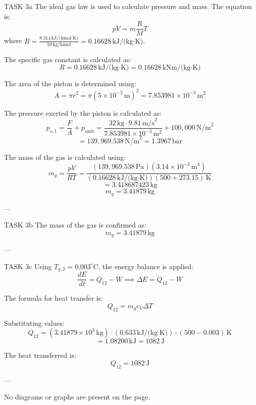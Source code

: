 TASK 3a  
The ideal gas law is used to calculate pressure and mass. The equation is:  
\[
pV = m \frac{R}{M} T
\]  
where \( R = \frac{8.314 \, \text{kJ/(kmol·K)}}{50 \, \text{kg/kmol}} = 0.16628 \, \text{kJ/(kg·K)} \).  

The specific gas constant is calculated as:  
\[
R = 0.16628 \, \text{kJ/(kg·K)} = 0.16628 \, \text{kNm/(kg·K)}
\]  

The area of the piston is determined using:  
\[
A = \pi r^2 = \pi (5 \times 10^{-2} \, \text{m})^2 = 7.853981 \times 10^{-3} \, \text{m}^2
\]  

The pressure exerted by the piston is calculated as:  
\[
p_{s,1} = \frac{F}{A} + p_{\text{amb}} = \frac{32 \, \text{kg} \cdot 9.81 \, \text{m/s}^2}{7.853981 \times 10^{-3} \, \text{m}^2} + 100,000 \, \text{N/m}^2
\]  
\[
= 139,969.538 \, \text{N/m}^2 = 1.3967 \, \text{bar}
\]  

The mass of the gas is calculated using:  
\[
m_g = \frac{pV}{RT} = \frac{(139,969.538 \, \text{Pa})(3.14 \times 10^{-3} \, \text{m}^3)}{(0.16628 \, \text{kJ/(kg·K)})(500 + 273.15) \, \text{K}}
\]  
\[
= 3.418687423 \, \text{kg}
\]  
\[
m_g = 3.41879 \, \text{kg}
\]  

---

TASK 3b  
The mass of the gas is confirmed as:  
\[
m_g = 3.41879 \, \text{kg}
\]  

---

TASK 3c  
Using \( T_{g,2} = 0.003^\circ \text{C} \), the energy balance is applied:  
\[
\frac{dE}{dt} = \dot{Q}_{12} - \dot{W} \implies \Delta E = Q_{12} - W
\]  

The formula for heat transfer is:  
\[
Q_{12} = m_g c_V \Delta T
\]  

Substituting values:  
\[
Q_{12} = (3.41879 \times 10^3 \, \text{kg}) \cdot (0.633 \, \text{kJ/(kg·K)}) \cdot (500 - 0.003) \, \text{K}
\]  
\[
= 1.08200 \, \text{kJ} = 1082 \, \text{J}
\]  

The heat transferred is:  
\[
Q_{12} = 1082 \, \text{J}
\]  

---

No diagrams or graphs are present on the page.